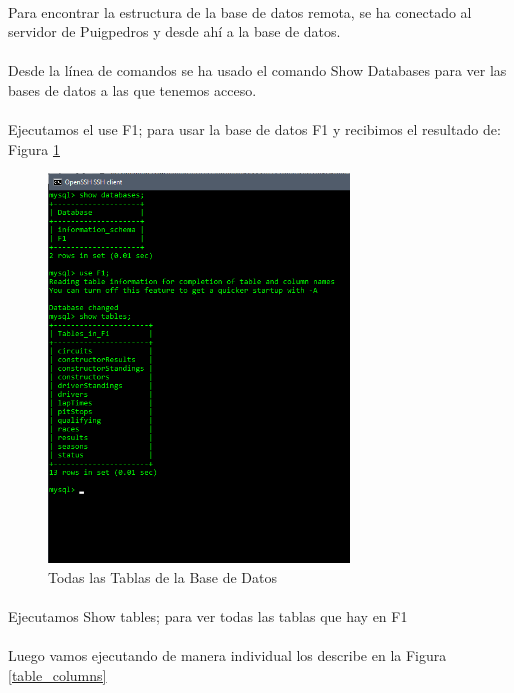 \documentclass[a4paper 
,twoside
]{article}
\begin{document}
  \paragraph{}
  Para encontrar la estructura de la base de datos remota, se ha conectado al servidor de Puigpedros y desde ahí a la base de datos. 

  \paragraph{}
  Desde la línea de comandos se ha usado el comando Show Databases para ver las bases de datos a las que tenemos acceso.

  \paragraph{}
  Ejecutamos el use F1; para usar la base de datos F1 y recibimos el resultado de: Figura \ref{tablas}

  \begin{figure}[H]
    \centering
    \label{tablas}
    \includegraphics[width=8cm]{tables.png}  
    \caption{Todas las Tablas de la Base de Datos}

  \end{figure}


  \paragraph{}
  Ejecutamos Show tables; para ver todas las tablas que hay en F1

  \paragraph{}
  Luego vamos ejecutando de manera individual los describe en la Figura \ref{table_columns}
\end{document}
